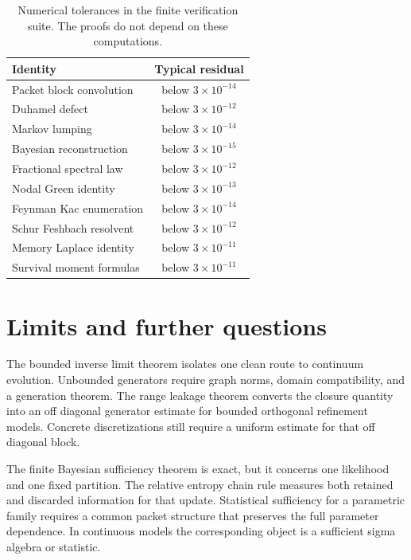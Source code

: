 \documentclass[11pt,letterpaper]{article}
\theoremstyle{plain}
\theoremstyle{plain}
\theoremstyle{plain}
\theoremstyle{definition}
\theoremstyle{definition}
\theoremstyle{definition}
\theoremstyle{definition}
\theoremstyle{definition}
\theoremstyle{remark}
\theoremstyle{remark}
\theoremstyle{remark}
\theoremstyle{remark}
\theoremstyle{remark}
\theoremstyle{remark}
\begin{document}
\begin{table}[t]
\centering
\begin{tabular}{lc}
\toprule
Identity & Typical residual \\
\midrule
Packet block convolution & below \(3\times10^{-14}\) \\
Duhamel defect & below \(3\times10^{-12}\) \\
Markov lumping & below \(3\times10^{-14}\) \\
Bayesian reconstruction & below \(3\times10^{-15}\) \\
Fractional spectral law & below \(3\times10^{-12}\) \\
Nodal Green identity & below \(3\times10^{-13}\) \\
Feynman Kac enumeration & below \(3\times10^{-14}\) \\
Schur Feshbach resolvent & below \(3\times10^{-12}\) \\
Memory Laplace identity & below \(3\times10^{-11}\) \\
Survival moment formulas & below \(3\times10^{-11}\) \\
\bottomrule
\end{tabular}
\caption{Numerical tolerances in the finite verification suite. The proofs do not depend on these computations.}
\label{extended:tab:verification_tolerances}
\end{table}

\FloatBarrier
\section{Limits and further questions}\label{extended:section:18}\label{extended:sec:limits}

The bounded inverse limit theorem isolates one clean route to continuum evolution. Unbounded generators require graph norms, domain compatibility, and a generation theorem. The range leakage theorem converts the closure quantity into an off diagonal generator estimate for bounded orthogonal refinement models. Concrete discretizations still require a uniform estimate for that off diagonal block.

The finite Bayesian sufficiency theorem is exact, but it concerns one likelihood and one fixed partition. The relative entropy chain rule measures both retained and discarded information for that update. Statistical sufficiency for a parametric family requires a common packet structure that preserves the full parameter dependence. In continuous models the corresponding object is a sufficient sigma algebra or statistic.
\end{document}
